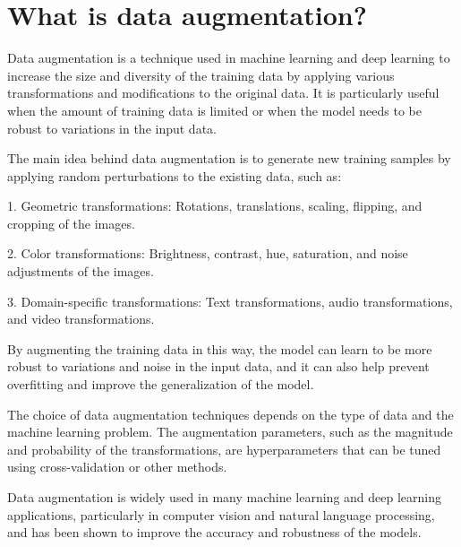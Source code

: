 \section{What is data augmentation?}
Data augmentation is a technique used in machine learning and deep learning to increase the size and diversity of the training data by applying various transformations and modifications to the original data. It is particularly useful when the amount of training data is limited or when the model needs to be robust to variations in the input data.

The main idea behind data augmentation is to generate new training samples by applying random perturbations to the existing data, such as:

1. Geometric transformations: Rotations, translations, scaling, flipping, and cropping of the images.

2. Color transformations: Brightness, contrast, hue, saturation, and noise adjustments of the images.

3. Domain-specific transformations: Text transformations, audio transformations, and video transformations.

By augmenting the training data in this way, the model can learn to be more robust to variations and noise in the input data, and it can also help prevent overfitting and improve the generalization of the model.

The choice of data augmentation techniques depends on the type of data and the machine learning problem. The augmentation parameters, such as the magnitude and probability of the transformations, are hyperparameters that can be tuned using cross-validation or other methods.

Data augmentation is widely used in many machine learning and deep learning applications, particularly in computer vision and natural language processing, and has been shown to improve the accuracy and robustness of the models.

